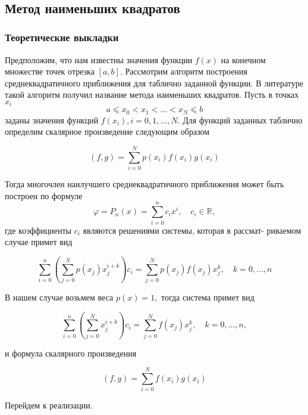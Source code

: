 \documentclass[11pt]{article}
\begin{document}
    \begin{center}
    \end{center}
    { \hspace*{\fill} \\}
    
    \subsection*{Метод наименьших
квадратов}\label{ux43cux435ux442ux43eux434-ux43dux430ux438ux43cux435ux43dux44cux448ux438ux445-ux43aux432ux430ux434ux440ux430ux442ux43eux432}

\subsubsection*{Теоретические
выкладки}\label{ux442ux435ux43eux440ux435ux442ux438ux447ux435ux441ux43aux438ux435-ux432ux44bux43aux43bux430ux434ux43aux438}

Предположим, что нам известны значения функции \(f(x)\) на конечном
множестве точек отрезка \([a, b]\). Рассмотрим алгоритм построения
среднеквадратичного приближения для таблично заданной функции. В
литературе такой алгоритм получил название метода наименьших квадратов.
Пусть в точках \(x_i\) \[a ⩽ x_0 < x_1 < ... < x_N ⩽ b\] заданы значения
функций \(f(x_i), i = 0, 1, ..., N\). Для функций заданных таблично
определим скалярное произведение следующим образом

\[(f, g) = \sum_{i=0}^{N} p(x_i) f(x_i) g(x_i)\]

Тогда многочлен наилучшего среднеквадратичного приближения может быть
построен по формуле
\[\varphi = P_n(x) = \sum_{i=0}^{n}c_ix^i,\quad c_i \in\mathbb{R}, \]
где коэффициенты \(c_i\) являются решениями системы, которая в рассмат-
риваемом случае примет вид

\[\sum_{i=0}^{n} \left( \sum_{j=0}^{N} p(x_j) x_{j}^{i+k} \right) c_i = \sum_{j=0}^{N} p(x_j) f(x_j) x_j^k, \quad k = 0, ...,n\]

В нашем случае возьмем веса \(p(x) = 1,\) тогда система примет вид

\[\sum_{i=0}^{n} \left( \sum_{j=0}^{N}x_{j}^{i+k} \right) c_i = \sum_{j=0}^{N}f(x_j) x_j^k, \quad k = 0, ...,n,\]

и формула скалярного произведения

\[(f, g) = \sum_{i=0}^{N}f(x_i) g(x_i)\]

Перейдем к реализации.
\end{document}

